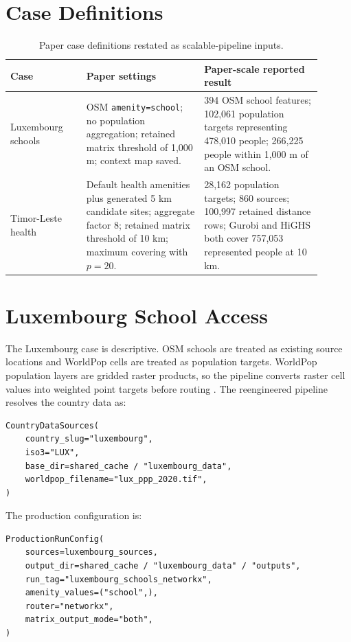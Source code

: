 \documentclass[11pt]{article}
\begin{document}
\section{Case Definitions}

\begin{table}[h]
\centering
\begin{tabular}{p{0.22\linewidth}p{0.34\linewidth}p{0.34\linewidth}}
\toprule
Case & Paper settings & Paper-scale reported result \\
\midrule
Luxembourg schools &
OSM \texttt{amenity=school}; no population aggregation; retained matrix
threshold of 1,000 m; context map saved. &
394 OSM school features; 102,061 population targets representing 478,010
people; 266,225 people within 1,000 m of an OSM school. \\
\addlinespace
Timor-Leste health &
Default health amenities plus generated 5 km candidate sites; aggregate factor
8; retained matrix threshold of 10 km; maximum covering with \(p=20\). &
28,162 population targets; 860 sources; 100,997 retained distance rows; Gurobi
and HiGHS both cover 757,053 represented people at 10 km. \\
\bottomrule
\end{tabular}
\caption{Paper case definitions restated as scalable-pipeline inputs.}
\end{table}

\section{Luxembourg School Access}

The Luxembourg case is descriptive.  OSM schools are treated as existing source
locations and WorldPop cells are treated as population targets.  WorldPop
population layers are gridded raster products, so the pipeline converts raster
cell values into weighted point targets before routing \cite{worldpop-data}.
The reengineered pipeline resolves the country data as:

\begin{verbatim}
CountryDataSources(
    country_slug="luxembourg",
    iso3="LUX",
    base_dir=shared_cache / "luxembourg_data",
    worldpop_filename="lux_ppp_2020.tif",
)
\end{verbatim}

The production configuration is:

\begin{verbatim}
ProductionRunConfig(
    sources=luxembourg_sources,
    output_dir=shared_cache / "luxembourg_data" / "outputs",
    run_tag="luxembourg_schools_networkx",
    amenity_values=("school",),
    router="networkx",
    matrix_output_mode="both",
)
\end{verbatim}
\end{document}
